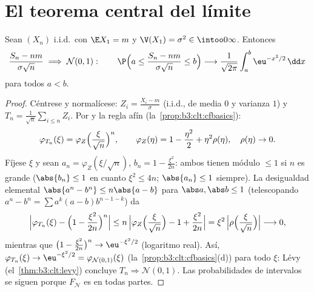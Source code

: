 \section{El teorema central del límite}

\begin{theorem}\label{thm:b3:clt:clt}
Sean $(X_n)$ i.i.d.\ con $\E X_1 = m$ y $\V(X_1) =
\sigma^2 \in \intoo0\infty$. Entonces
\[
\frac{S_n - nm}{\sigma\sqrt n} \;\Longrightarrow\; \mathcal
N(0, 1) :
\qquad
\P\Bigl(a \leq \frac{S_n - nm}{\sigma\sqrt n} \leq
b\Bigr) \longrightarrow
\frac{1}{\sqrt{2\pi}}\int_a^b\eu^{-x^2/2}\,\dd x
\]
para todos $a < b$.
\end{theorem}

\begin{proof}
Céntrese y normalícese:
$Z_i = \frac{X_i - m}{\sigma}$ (i.i.d., de media $0$ y varianza $1$) y
$T_n =
\frac1{\sqrt n}\sum_{i\leq n}Z_i$. Por
 y la regla afín
(la~\cref{prop:b3:clt:cfbasics}):
\[
\varphi_{T_n}(\xi) =
\varphi_{Z}\Bigl(\frac{\xi}{\sqrt n}\Bigr)^{n},
\qquad
\varphi_Z(\eta) = 1 - \frac{\eta^2}2 + \eta^2\rho(\eta),\quad
\rho(\eta)\to0 .
\]
Fíjese $\xi$ y sean $a_n = \varphi_Z(\xi/\sqrt n)$, $b_n = 1 -
\frac{\xi^2}{2n}$: ambos tienen módulo $\leq 1$ si $n$ es grande
($\abs{b_n} \leq 1$ en cuanto $\xi^2 \leq 4n$; $\abs{a_n} \leq 1$
siempre). La desigualdad elemental $\abs{a^n - b^n} \leq
n\abs{a - b}$ para $\abs a, \abs b \leq 1$ (telescopando
$a^n - b^n = \sum a^k(a - b)b^{n-1-k}$) da
\[
\Bigl|\varphi_{T_n}(\xi) - \Bigl(1 -
\frac{\xi^2}{2n}\Bigr)^{n}\Bigr|
\leq n\,\Bigl|\varphi_Z\Bigl(\frac\xi{\sqrt n}\Bigr) - 1 +
\frac{\xi^2}{2n}\Bigr|
= \xi^2\,\Bigl|\rho\Bigl(\frac{\xi}{\sqrt n}\Bigr)\Bigr|
\longrightarrow 0,
\]
mientras que $\bigl(1 - \frac{\xi^2}{2n}\bigr)^n \to
\eu^{-\xi^2/2}$ (logaritmo real). Así, $\varphi_{T_n}(\xi) \to
\eu^{-\xi^2/2} = \varphi_{\mathcal N(0,1)}(\xi)$
(la~\cref{prop:b3:clt:cfbasics}(d)) para todo $\xi$: Lévy
(el~\cref{thm:b3:clt:levy}) concluye $T_n \Rightarrow \mathcal
N(0,1)$. Las probabilidades de intervalos se siguen porque $F_{\mathcal
N}$ es  en todas partes.
\end{proof}

